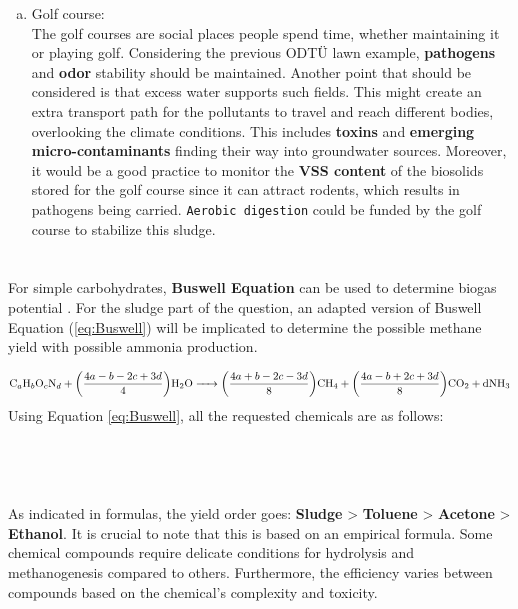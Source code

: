 \documentclass[a4paper]{article}
\begin{document}
\begin{enumerate}[a)]
    \item Golf course:\\
    The golf courses are social places people spend time, whether maintaining it or playing golf. Considering the previous ODTÜ lawn example, \textbf{pathogens} and \textbf{odor} stability should be maintained. Another point that should be considered is that excess water supports such fields. This might create an extra transport path for the pollutants to travel and reach different bodies, overlooking the climate conditions. This includes \textbf{toxins} and \textbf{emerging micro-contaminants} finding their way into groundwater sources. Moreover, it would be a good practice to monitor the \textbf{VSS content} of the biosolids stored for the golf course since it can attract rodents, which results in pathogens being carried\autocite{vesilind1988}. \texttt{Aerobic digestion} could be funded by the golf course to stabilize this sludge.
\end{enumerate}
\section{} %
\begin{minipage}[c]{0.5\textwidth}
For simple carbohydrates, \textbf{Buswell Equation} can be used to determine biogas potential \autocite{buswell1933}. For the sludge part of the question, an adapted version of Buswell Equation (\ref{eq:Buswell}) will be implicated to determine the possible methane yield with possible ammonia production\autocite{Angelidaki2004, sialve2009}.
\end{minipage}
\hfill
\begin{minipage}{0.4\textwidth}
\end{minipage}
\begin{equation}
    \ce{C_aH_bO_cN_d + $\left(\frac{4a - b - 2c + 3d}{4}\right)$H2O -> $\left(\frac{4a + b - 2c - 3d}{8}\right)$CH4 +  $\left(\frac{4a - b + 2c + 3d}{8}\right)$CO2 + dNH3}\label{eq:Buswell}
\end{equation}
Using Equation \ref{eq:Buswell}, all the requested chemicals are as follows:\\
\\
\\
\\
\\
As indicated in formulas, the yield order goes: \textbf{Sludge} > \textbf{Toluene} > \textbf{Acetone} > \textbf{Ethanol}. It is crucial to note that this is based on an empirical formula. Some chemical compounds require delicate conditions for hydrolysis and methanogenesis compared to others. Furthermore, the efficiency varies between compounds based on the chemical's complexity and toxicity\autocite{Edwards1994}.
\end{document}
